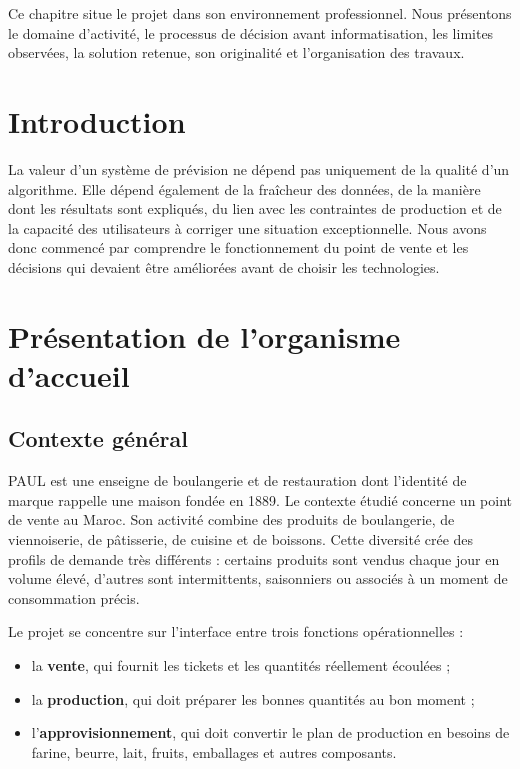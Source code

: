 
\begin{objectifbox}
Ce chapitre situe le projet dans son environnement professionnel. Nous présentons
le domaine d'activité, le processus de décision avant informatisation, les limites
observées, la solution retenue, son originalité et l'organisation des travaux.
\end{objectifbox}

\section{Introduction}

La valeur d'un système de prévision ne dépend pas uniquement de la qualité d'un
algorithme. Elle dépend également de la fraîcheur des données, de la manière dont
les résultats sont expliqués, du lien avec les contraintes de production et de la
capacité des utilisateurs à corriger une situation exceptionnelle. Nous avons
donc commencé par comprendre le fonctionnement du point de vente et les décisions
qui devaient être améliorées avant de choisir les technologies.

\section{Présentation de l'organisme d'accueil}

\subsection{Contexte général}

PAUL est une enseigne de boulangerie et de restauration dont l'identité de marque
rappelle une maison fondée en 1889. Le contexte étudié concerne un point de vente
au Maroc. Son activité combine des produits de boulangerie, de viennoiserie, de
pâtisserie, de cuisine et de boissons. Cette diversité crée des profils de demande
très différents : certains produits sont vendus chaque jour en volume élevé,
d'autres sont intermittents, saisonniers ou associés à un moment de consommation
précis.

Le projet se concentre sur l'interface entre trois fonctions opérationnelles :

\begin{itemize}
  \item la \textbf{vente}, qui fournit les tickets et les quantités réellement
  écoulées ;
  \item la \textbf{production}, qui doit préparer les bonnes quantités au bon
  moment ;
  \item l'\textbf{approvisionnement}, qui doit convertir le plan de production en
  besoins de farine, beurre, lait, fruits, emballages et autres composants.
\end{itemize}

